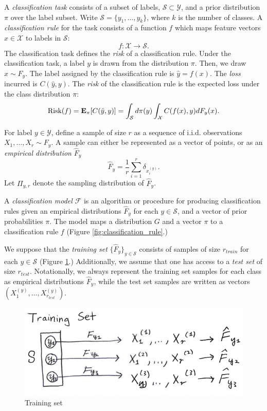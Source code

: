 \documentclass[12pt]{article}
\begin{document}
A \emph{classification task} consists of a subset of labels,
$\mathcal{S} \subset \mathcal{Y}$, and a prior distribution $\pi$ over
the label subset.  Write $\mathcal{S}=\{y_1,\hdots, y_k\}$, where $k$
is the number of classes.  A \emph{classification rule} for the task
consists of a function $f$ which maps feature vectors
$x \in \mathcal{X}$ to labels in $\mathcal{S}$:
\[
f: \mathcal{X} \to \mathcal{S}.
\]
The classification task defines the \emph{risk} of a classification
rule.  Under the classification task, a label $y$ is drawn from the
distribution $\pi$.  Then, we draw $x \sim F_y$.  The label assigned
by the classification rule is $\hat{y} = f(x)$.  The \emph{loss}
incurred is $C(\hat{y}, y)$.  The \emph{risk} of the classification
rule is the expected loss under the class distribution $\pi$:
\[
\text{Risk}(f) = \textbf{E}_\pi[C(\hat{y}, y)] = \int_\mathcal{S} d \pi(y) \int_{\mathcal{X}} C(f(x), y) dF_y(x).
\]

For label $y \in \mathcal{Y}$, define a sample of size $r$ as a
sequence of i.i.d. observations $X_1,\hdots, X_r \sim F_y$.
A sample can either be represented as a vector of points, or as
an \emph{empirical distribution} $\hat{F}_y$
\[\hat{F}_y = \frac{1}{r}\sum_{i=1}^r \delta_{x_i^{(y)}}.\]
Let $\Pi_{y, r}$ denote the sampling distribution of $\hat{F}_y$.

A \emph{classification model} $\mathcal{F}$ is an algorithm or
procedure for producing classification rules given an empirical
distributions $\hat{F}_y$ for each $y \in \mathcal{S}$, and a vector
of prior probabilities $\pi$.  The model maps a distribution $G$ and a
vector $\pi$ to a classification rule $f$ (Figure \ref{fig:classification_rule}.)

We suppose that the \emph{training set}
$\{\hat{F}_y\}_{y \in \mathcal{S}}$ consists of samples of size
$r_{train}$ for each $y \in \mathcal{S}$
(Figure \ref{fig:training_set}.) Additionally, we assume that one has
access to a \emph{test set} of size $r_{test}$.  Notationally, we
always represent the training set samples for each class as empirical
distributions $\hat{F}_y$, while the test set samples are written as
vectors $(X^{(y)}_1,\hdots, X^{(y)}_{r_{test}})$.

\begin{figure}[h]
\centering
\includegraphics[scale = 0.4]{extrapolation_figures/training_set.png}
\caption{Training set}\label{fig:training_set}
\end{figure}
\end{document}
